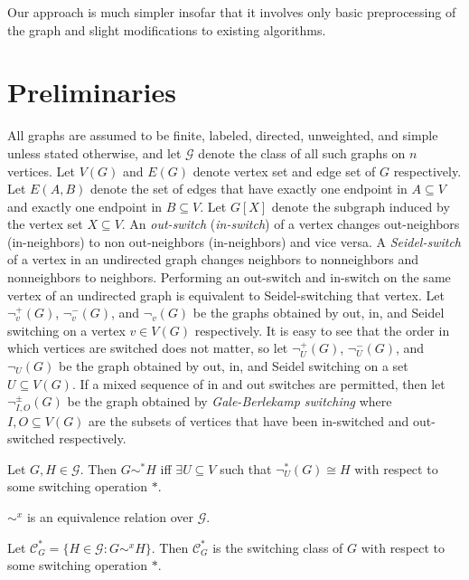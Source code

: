 \documentclass{llncs}
\begin{document}
Our approach is much simpler insofar that it involves only basic preprocessing of the graph and slight modifications to existing algorithms.

\section{Preliminaries}
All graphs are assumed to be finite, labeled, directed, unweighted, and simple unless stated otherwise, and let $\mathcal{G}$ denote the class of all such graphs on $n$ vertices. Let $V(G)$ and $E(G)$ denote vertex set and edge set of $G$ respectively.  Let $E(A,B)$ denote the set of edges that have exactly one endpoint in $A \subseteq V$ and exactly one endpoint in $B \subseteq V$.  Let $G[X]$ denote the subgraph induced by the vertex set $X \subseteq V$.  An \emph{out-switch} (\emph{in-switch}) of a vertex changes out-neighbors (in-neighbors) to non out-neighbors (in-neighbors) and vice versa. A \emph{Seidel-switch} of a vertex in an undirected graph changes neighbors to nonneighbors and nonneighbors to neighbors.  Performing an out-switch and in-switch on the same vertex of an undirected graph is equivalent to Seidel-switching that vertex.  Let $\neg^+_v(G)$, $\neg^-_v(G)$, and $\neg_v(G)$ be the graphs obtained by out, in, and Seidel switching on a vertex $v \in V(G)$ respectively.  It is easy to see that the order in which vertices are switched does not matter, so let $\neg^+_U(G)$, $\neg^-_U(G)$, and $\neg_U(G)$ be the graph obtained by out, in, and Seidel switching on a set $U \subseteq V(G)$.  If a mixed sequence of in and out switches are permitted, then let $\neg^{\pm}_{I,O}(G)$ be the graph obtained by \emph{Gale-Berlekamp switching} where $I,O \subseteq V(G)$ are the subsets of vertices that have been in-switched and out-switched respectively.

\begin{definition}
Let $G,H \in \mathcal{G}$.  Then $G \sim^* H$ iff $\exists U \subseteq V$ such that $\neg^*_U(G) \cong H$ with respect to some switching operation $*$.
\end{definition}

\begin{proposition}
$\sim^x$ is an equivalence relation over $\mathcal{G}$.
\end{proposition}

\begin{definition}
Let $\mathcal{C}^*_G = \{H \in \mathcal{G} : G \sim^x H\}$.  Then $\mathcal{C}^*_G$ is the switching class of $G$ with respect to some switching operation $*$.
\end{definition}
\end{document}
